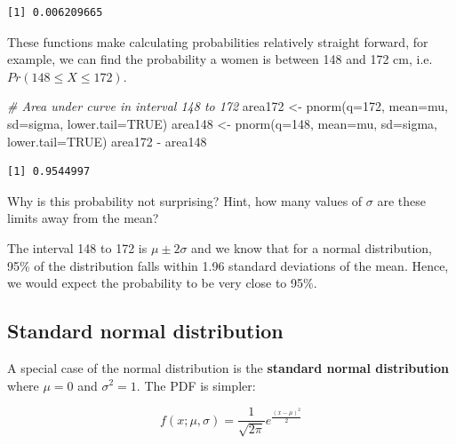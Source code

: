\documentclass[
  oneside]{krantz}
\newenvironment{Shaded}{\begin{snugshade}}{\end{snugshade}}
\newcommand{\AttributeTok}[1]{\textcolor[rgb]{0.77,0.63,0.00}{#1}}
\newcommand{\CommentTok}[1]{\textcolor[rgb]{0.56,0.35,0.01}{\textit{#1}}}
\newcommand{\ConstantTok}[1]{\textcolor[rgb]{0.00,0.00,0.00}{#1}}
\newcommand{\DecValTok}[1]{\textcolor[rgb]{0.00,0.00,0.81}{#1}}
\newcommand{\FunctionTok}[1]{\textcolor[rgb]{0.00,0.00,0.00}{#1}}
\newcommand{\NormalTok}[1]{#1}
\newcommand{\OtherTok}[1]{\textcolor[rgb]{0.56,0.35,0.01}{#1}}
\newcommand{\SpecialCharTok}[1]{\textcolor[rgb]{0.00,0.00,0.00}{#1}}
\begin{document}
\begin{verbatim}
[1] 0.006209665
\end{verbatim}

These functions make calculating probabilities relatively straight forward, for example, we can find the probability a women is between 148 and 172 cm, i.e.~\(Pr(148 \le X \le 172)\).

\begin{Shaded}
\begin{Highlighting}[]
\CommentTok{\# Area under curve in interval 148 to 172}
\NormalTok{area172 }\OtherTok{\textless{}{-}} \FunctionTok{pnorm}\NormalTok{(}\AttributeTok{q=}\DecValTok{172}\NormalTok{, }\AttributeTok{mean=}\NormalTok{mu, }\AttributeTok{sd=}\NormalTok{sigma, }\AttributeTok{lower.tail=}\ConstantTok{TRUE}\NormalTok{)}
\NormalTok{area148 }\OtherTok{\textless{}{-}} \FunctionTok{pnorm}\NormalTok{(}\AttributeTok{q=}\DecValTok{148}\NormalTok{, }\AttributeTok{mean=}\NormalTok{mu, }\AttributeTok{sd=}\NormalTok{sigma, }\AttributeTok{lower.tail=}\ConstantTok{TRUE}\NormalTok{)}
\NormalTok{area172 }\SpecialCharTok{{-}}\NormalTok{ area148}
\end{Highlighting}
\end{Shaded}

\begin{verbatim}
[1] 0.9544997
\end{verbatim}

Why is this probability not surprising? Hint, how many values of \(\sigma\) are these limits away from the mean?

The interval 148 to 172 is \(\mu \pm 2 \sigma\) and we know that for a normal distribution, 95\% of the distribution falls within 1.96 standard deviations of the mean. Hence, we would expect the probability to be very close to 95\%.

\hypertarget{standard-normal-distribution}{%
\subsection{Standard normal distribution}\label{standard-normal-distribution}}

A special case of the normal distribution is the \textbf{standard normal distribution} where \(\mu=0\) and \(\sigma^2=1\). The PDF is simpler:

\begin{equation}
f(x; \mu, \sigma) = \frac{1}{\sqrt{2\pi}}e^{\frac{(x - \mu)^2}{2}}
\end{equation}
\end{document}
